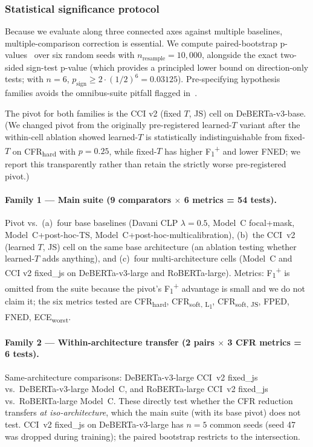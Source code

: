 \subsubsection{Statistical significance protocol}
\label{sec:sig_protocol}

Because we evaluate along three connected axes against multiple baselines, multiple-comparison correction is essential. We compute paired-bootstrap p-values~\citep{dror2018hitchhikers} over six random seeds with $n_{\text{resample}} = 10{,}000$, alongside the exact two-sided sign-test p-value (which provides a principled lower bound on direction-only tests; with $n=6$, $p_{\text{sign}} \ge 2 \cdot (1/2)^6 = 0.03125$). Pre-specifying hypothesis families avoids the omnibus-suite pitfall flagged in~\citet{dror2018hitchhikers}.

The pivot for both families is the CCI v2 (fixed $T$, JS) cell on DeBERTa-v3-base. (We changed pivot from the originally pre-registered learned-$T$ variant after the within-cell ablation showed learned-$T$ is statistically indistinguishable from fixed-$T$ on CFR\textsubscript{hard} with $p = 0.25$, while fixed-$T$ has higher F\textsubscript{1}\textsuperscript{+} and lower FNED; we report this transparently rather than retain the strictly worse pre-registered pivot.)

\paragraph{Family 1 — Main suite (9 comparators $\times$ 6 metrics = 54 tests).}
Pivot vs.\ (a)~four base baselines (Davani CLP $\lambda{=}0.5$, Model~C focal+mask, Model~C+post-hoc-TS, Model~C+post-hoc-multicalibration), (b)~the CCI~v2 (learned $T$, JS) cell on the same base architecture (an ablation testing whether learned-$T$ adds anything), and (c)~four multi-architecture cells (Model~C and CCI v2 fixed\_js on DeBERTa-v3-large and RoBERTa-large). Metrics: F\textsubscript{1}\textsuperscript{+} is omitted from the suite because the pivot's F\textsubscript{1}\textsuperscript{+} advantage is small and we do not claim it; the six metrics tested are CFR\textsubscript{hard}, CFR\textsubscript{soft, L\textsubscript{1}}, CFR\textsubscript{soft, JS}, FPED, FNED, ECE\textsubscript{worst}.

\paragraph{Family 2 — Within-architecture transfer (2 pairs $\times$ 3 CFR metrics = 6 tests).}
Same-architecture comparisons: DeBERTa-v3-large CCI~v2 fixed\_js vs.\ DeBERTa-v3-large Model~C, and RoBERTa-large CCI~v2 fixed\_js vs.\ RoBERTa-large Model~C. These directly test whether the CFR reduction transfers \emph{at iso-architecture}, which the main suite (with its base pivot) does not test. CCI~v2 fixed\_js on DeBERTa-v3-large has $n=5$ common seeds (seed 47 was dropped during training); the paired bootstrap restricts to the intersection.

